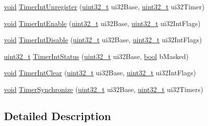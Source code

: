 \begin{DoxyCompactItemize}
\item 
\hyperlink{usb__devapi_8h_afabf60e7f57651d6d595a02c75f07cd0}{void} \hyperlink{group__timer__api_ga39e29286ff94f0cb483cce21a3253516}{Timer\+Int\+Unregister} (\hyperlink{_p_e___types_8h_a33594304e786b158f3fb30289278f5af}{uint32\+\_\+t} ui32\+Base, \hyperlink{_p_e___types_8h_a33594304e786b158f3fb30289278f5af}{uint32\+\_\+t} ui32\+Timer)
\item 
\hyperlink{usb__devapi_8h_afabf60e7f57651d6d595a02c75f07cd0}{void} \hyperlink{group__timer__api_gaf5153c3e27648ca57b95adc691d0afdf}{Timer\+Int\+Enable} (\hyperlink{_p_e___types_8h_a33594304e786b158f3fb30289278f5af}{uint32\+\_\+t} ui32\+Base, \hyperlink{_p_e___types_8h_a33594304e786b158f3fb30289278f5af}{uint32\+\_\+t} ui32\+Int\+Flags)
\item 
\hyperlink{usb__devapi_8h_afabf60e7f57651d6d595a02c75f07cd0}{void} \hyperlink{group__timer__api_ga5bdf8fb309917c80b5026c0969517b90}{Timer\+Int\+Disable} (\hyperlink{_p_e___types_8h_a33594304e786b158f3fb30289278f5af}{uint32\+\_\+t} ui32\+Base, \hyperlink{_p_e___types_8h_a33594304e786b158f3fb30289278f5af}{uint32\+\_\+t} ui32\+Int\+Flags)
\item 
\hyperlink{_p_e___types_8h_a33594304e786b158f3fb30289278f5af}{uint32\+\_\+t} \hyperlink{group__timer__api_gaf96decff3251059ea7b928575148d162}{Timer\+Int\+Status} (\hyperlink{_p_e___types_8h_a33594304e786b158f3fb30289278f5af}{uint32\+\_\+t} ui32\+Base, \hyperlink{_p_e___types_8h_a97a80ca1602ebf2303258971a2c938e2}{bool} b\+Masked)
\item 
\hyperlink{usb__devapi_8h_afabf60e7f57651d6d595a02c75f07cd0}{void} \hyperlink{group__timer__api_ga57384a0128e97c9059b9a6b5152486c6}{Timer\+Int\+Clear} (\hyperlink{_p_e___types_8h_a33594304e786b158f3fb30289278f5af}{uint32\+\_\+t} ui32\+Base, \hyperlink{_p_e___types_8h_a33594304e786b158f3fb30289278f5af}{uint32\+\_\+t} ui32\+Int\+Flags)
\item 
\hyperlink{usb__devapi_8h_afabf60e7f57651d6d595a02c75f07cd0}{void} \hyperlink{group__timer__api_ga22ba9db9e3e01445e9d9be881ff3bba6}{Timer\+Synchronize} (\hyperlink{_p_e___types_8h_a33594304e786b158f3fb30289278f5af}{uint32\+\_\+t} ui32\+Base, \hyperlink{_p_e___types_8h_a33594304e786b158f3fb30289278f5af}{uint32\+\_\+t} ui32\+Timers)
\end{DoxyCompactItemize}


\subsection{Detailed Description}


